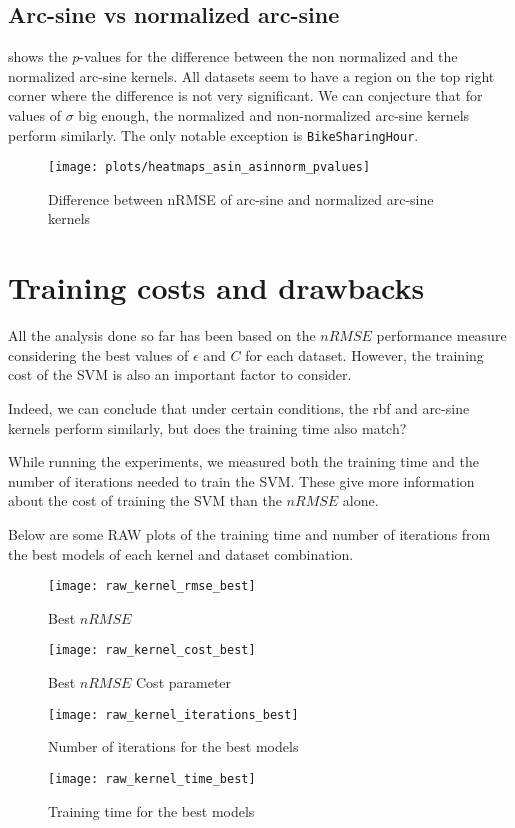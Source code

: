\subsection{Arc-sine vs normalized arc-sine}

 shows the $p$-values for the difference between
the non normalized and the normalized arc-sine kernels. All datasets seem to have
a region on the top right corner where the difference is not very significant.
We can conjecture that for values of $\sigma$ big enough, the normalized and
non-normalized arc-sine kernels perform similarly. The only notable exception is
\texttt{BikeSharingHour}.

\begin{figure}[H]
    \texttt{[image: plots/heatmaps\_asin\_asinnorm\_pvalues]}
    \caption{Difference between nRMSE of arc-sine and normalized arc-sine kernels}
    \label{fig:heatmaps-asin-asinnorm}
\end{figure}

\section{Training costs and drawbacks}

All the analysis done so far has been based on the $nRMSE$ performance measure
considering the best values of $\epsilon$ and $C$ for each dataset. However,
the training cost of the SVM is also an important factor to consider.

Indeed, we can conclude that under certain conditions, the rbf and arc-sine
kernels perform similarly, but does the training time also match?

While running the experiments, we measured both the training time and the
number of iterations needed to train the SVM. These give more information
about the cost of training the SVM than the $nRMSE$ alone.

\begin{cnote}
    Below are some RAW plots of the training time and number of iterations
    from the best models of each kernel and dataset combination.
\end{cnote}
\begin{figure}[H]
    \texttt{[image: raw\_kernel\_rmse\_best]}
    \caption{Best $nRMSE$}
\end{figure}
\begin{figure}[H]
    \texttt{[image: raw\_kernel\_cost\_best]}
    \caption{Best $nRMSE$ Cost parameter}
\end{figure}
\begin{figure}[H]
    \texttt{[image: raw\_kernel\_iterations\_best]}
    \caption{Number of iterations for the best models}
\end{figure}
\begin{figure}[H]
    \texttt{[image: raw\_kernel\_time\_best]}
    \caption{Training time for the best models}
\end{figure}

